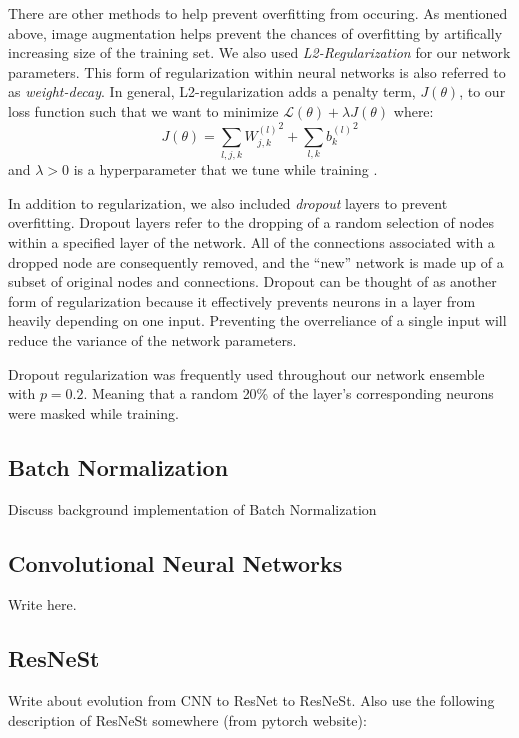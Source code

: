 \documentclass [MAS] {uclathes}
\begin{document}
There are other methods to help prevent overfitting from occuring. As mentioned above, image augmentation helps prevent the chances of overfitting by artifically increasing size of the training set. We also used \textit{L2-Regularization} for our network parameters. This form of regularization within neural networks is also referred to as \textit{weight-decay}. In general, L2-regularization adds a penalty term, $J(\theta)$, to our loss function such that we want to minimize $\mathcal{L}(\theta) + \lambda J(\theta)$ where: $$J(\theta) = \sum_{l, j, k} {W^{(l)}_{j, k}}^2 + \sum_{l, k} {b^{(l)}_{k}}^2$$ and $\lambda > 0$ is a hyperparameter that we tune while training \cite{ESL}. 

In addition to regularization, we also included \textit{dropout} layers to prevent overfitting. Dropout layers refer to the dropping of a random selection of nodes within a specified layer of the network. All of the connections associated with a dropped node are consequently removed, and the ``new'' network is made up of a subset of original nodes and connections. Dropout can be thought of as another form of regularization because it effectively prevents neurons in a layer from heavily depending on one input. Preventing the overreliance of a single input will reduce the variance of the network parameters. 

Dropout regularization was frequently used throughout our network ensemble with $p = 0.2$. Meaning that a random 20\% of the layer's corresponding neurons were masked while training. 


\subsection{Batch Normalization}

Discuss background implementation of Batch Normalization

\subsection{Convolutional Neural Networks}

Write here. 

\subsection{ResNeSt}

Write about evolution from CNN to ResNet to ResNeSt. Also use the following description of ResNeSt somewhere (from pytorch website):
\end{document}
